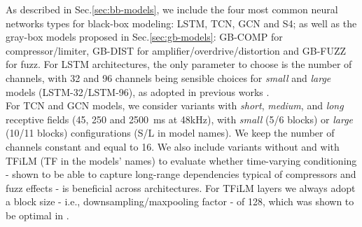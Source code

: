 As described in Sec.\ref{sec:bb-models}, we include the four most common neural networks types for black-box modeling: LSTM, TCN, GCN and S4; as well as the gray-box models proposed in Sec.\ref{sec:gb-models}: GB-COMP for compressor/limiter, GB-DIST for amplifier/overdrive/distortion and GB-FUZZ for fuzz.
For LSTM architectures, the only parameter to choose is the number of channels, with 32 and 96 channels being sensible choices for \textit{small} and \textit{large} models (LSTM-32/LSTM-96), as adopted in previous works \cite{wright2020real, steinmetz2022efficient, comunita2023modelling}.\\
For TCN and GCN models, we consider variants with \textit{short}, \textit{medium}, and \textit{long} receptive fields (45, 250 and 2500~ms at 48kHz), with \textit{small} (5/6 blocks) or \textit{large} (10/11 blocks) configurations (S/L in model names).
We keep the number of channels constant and equal to 16.
We also include variants without and with TFiLM (TF in the models' names) to evaluate whether time-varying conditioning - shown to be able to capture long-range dependencies \citep{comunita2023modelling} typical of compressors and fuzz effects - is beneficial across architectures. 
For TFiLM layers we always adopt a block size - i.e., downsampling/maxpooling factor - of 128, which was shown to be optimal in \citep{comunita2023modelling}.
